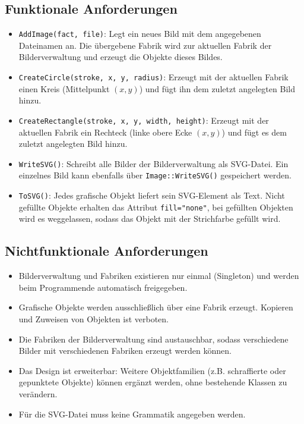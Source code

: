 \documentclass[a4paper,12pt]{article}
\begin{document}
\subsection*{Funktionale Anforderungen}
\begin{itemize}
  \item \texttt{AddImage(fact, file)}: Legt ein neues Bild mit dem
        angegebenen Dateinamen an. Die übergebene Fabrik wird zur aktuellen
        Fabrik der Bilderverwaltung und erzeugt die Objekte dieses Bildes.
  \item \texttt{CreateCircle(stroke, x, y, radius)}: Erzeugt mit der aktuellen
        Fabrik einen Kreis (Mittelpunkt $(x,y)$) und fügt ihn dem zuletzt
        angelegten Bild hinzu.
  \item \texttt{CreateRectangle(stroke, x, y, width, height)}: Erzeugt mit der
        aktuellen Fabrik ein Rechteck (linke obere Ecke $(x,y)$) und fügt es
        dem zuletzt angelegten Bild hinzu.
  \item \texttt{WriteSVG()}: Schreibt alle Bilder der Bilderverwaltung als
        SVG-Datei. Ein einzelnes Bild kann ebenfalls über
        \texttt{Image::WriteSVG()} gespeichert werden.
  \item \texttt{ToSVG()}: Jedes grafische Objekt liefert sein SVG-Element als
        Text. Nicht gefüllte Objekte erhalten das Attribut
        \texttt{fill="none"}, bei gefüllten Objekten wird es weggelassen, sodass
        das Objekt mit der Strichfarbe gefüllt wird.
\end{itemize}

\subsection{Nichtfunktionale Anforderungen}
\begin{itemize}
  \item Bilderverwaltung und Fabriken existieren nur einmal (Singleton) und
        werden beim Programmende automatisch freigegeben.
  \item Grafische Objekte werden ausschließlich über eine Fabrik erzeugt.
        Kopieren und Zuweisen von Objekten ist verboten.
  \item Die Fabriken der Bilderverwaltung sind austauschbar, sodass
        verschiedene Bilder mit verschiedenen Fabriken erzeugt werden können.
  \item Das Design ist erweiterbar: Weitere Objektfamilien (z.B.
        schraffierte oder gepunktete Objekte) können ergänzt werden, ohne
        bestehende Klassen zu verändern.
  \item Für die SVG-Datei muss keine Grammatik angegeben werden.
\end{itemize}
\end{document}

